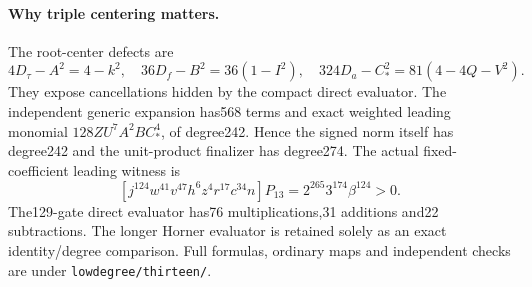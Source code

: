 \paragraph{Why triple centering matters.}
The root-center defects are
\[
 4D_\tau-A^2=4-k^2,\quad
 36D_f-B^2=36(1-I^2),\quad
 324D_a-C_*^2=81(4-4Q-V^2).
\]
They expose cancellations hidden by the compact direct evaluator.  The
independent generic expansion has568 terms and exact weighted leading
monomial $128ZU^7A^2BC_*^4$, of degree242.  Hence the signed norm itself
has degree242 and the unit-product finalizer has degree274.  The actual
fixed-coefficient leading witness is
\[
 [j^{124}w^{41}v^{47}h^6z^4r^{17}c^{34}n]P_{13}
 =2^{265}3^{174}\beta^{124}>0.
\]
The129-gate direct evaluator has76 multiplications,31 additions and22
subtractions.  The longer Horner evaluator is retained solely as an exact
identity/degree comparison.  Full formulas, ordinary maps and independent
checks are under \texttt{lowdegree/thirteen/}.
